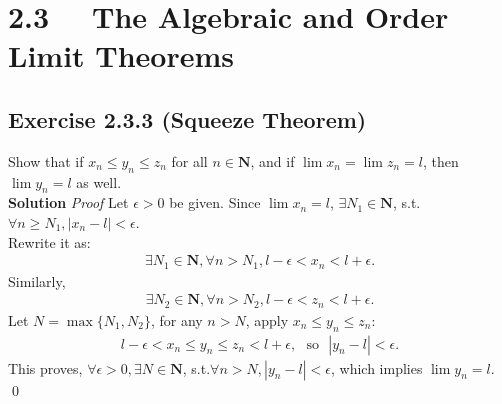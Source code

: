 \documentclass[12pt]{report}
\begin{document}
\section{2.3 ~~The Algebraic and Order Limit Theorems}
\subsection*{Exercise 2.3.3 (Squeeze Theorem)}
Show that if $x_n \leq y_n \leq z_n$ for all $n \in \mathbf{N}$, and if $\lim x_n=\lim z_n=l$, then $\lim y_n=l$ as well.\\
\textbf{Solution} \textit{Proof} Let $\epsilon >0$ be given. Since $\lim x_n = l$, $\exists N_1 \in \mathbf{N}$, s.t. $\forall n \geq N_1, |x_n-l| < \epsilon$.\\
Rewrite it as:
\begin{align*}
    \exists N_1 \in \mathbf{N}, \forall n > N_1, l-\epsilon< x_n < l+\epsilon.
\end{align*}
Similarly,
\begin{align*}
    \exists N_2 \in \mathbf{N}, \forall n > N_2, l-\epsilon< z_n < l+\epsilon.
\end{align*}
Let $N = \max\{N_1,N_2\}$, for any $n>N$, apply $x_n\leq y_n \leq z_n$:
\begin{align*}
    l-\epsilon <x_n \leq y_n \leq z_n < l+\epsilon, ~~~\text{so}~~~ |y_n-l|<\epsilon.
\end{align*}
This proves, $\forall \epsilon >0 , \exists N \in \mathbf{N} $, s.t.$\forall n > N, |y_n-l| < \epsilon$, which implies $\lim y_n = l$. \qed
\end{document}
